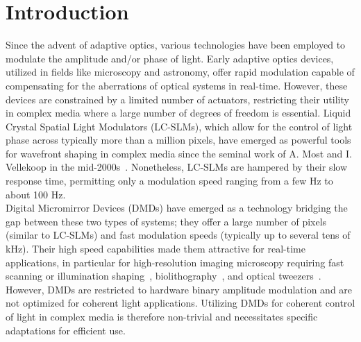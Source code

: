 \documentclass[12pt]{iopart}
\begin{document}
\section{Introduction}

Since the advent of adaptive optics, various technologies have been employed
to modulate the amplitude and/or phase of light.
Early adaptive optics devices, utilized in fields like microscopy and astronomy,
offer rapid modulation capable of compensating for the aberrations of optical systems
in real-time.
However, these devices are constrained by a limited number of actuators,
restricting their utility in complex media where a large number of degrees of freedom is essential.
Liquid Crystal Spatial Light Modulators (LC-SLMs),
which allow for the control of light phase across typically more than a million pixels,
have emerged as powerful tools for wavefront shaping in complex media
since the seminal work of A. Most and I. Vellekoop in the mid-2000s~\cite{Vellekoop2007focusing}.
Nonetheless, LC-SLMs are hampered by their slow response time,
permitting only a modulation speed ranging from a few Hz to about 100 Hz.\\

Digital Micromirror Devices (DMDs) have emerged as a technology bridging the gap
between these two types of systems;
they offer a large number of pixels (similar to LC-SLMs) and fast modulation speeds (typically up to several tens of kHz).
Their high speed capabilities made them attractive for real-time applications,
in particular for high-resolution imaging microscopy
requiring fast scanning or illumination shaping~\cite{cha2000nontranslational,Zhuang2020},
biolithography~\cite{yoon2018emerging},
and optical tweezers~\cite{gauthier2016direct}.
However, DMDs are restricted to hardware binary amplitude modulation and are not optimized for coherent light applications.
Utilizing DMDs for coherent control of light in complex media is therefore non-trivial
and necessitates specific adaptations for efficient use.\\
\end{document}
